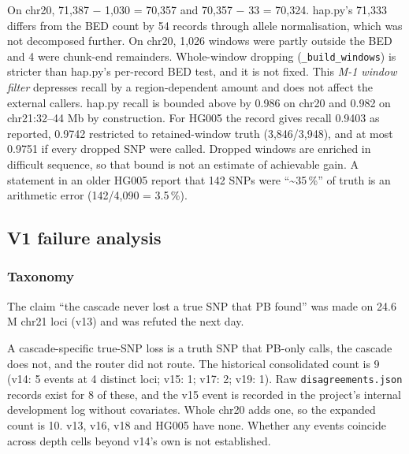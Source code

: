 \documentclass[11pt,a4paper]{article}
\makeatletter
\newcommand{\needspace}[1]{\par\ifdim\pagegoal=\maxdimen\else\dimen@=\pagegoal\advance\dimen@-\pagetotal\ifdim\dimen@<#1\relax\newpage\fi\fi}
\makeatother
\begin{document}
On chr20, 71,387 $-$ 1,030 = 70,357 and 70,357 $-$ 33 = 70,324. hap.py's 71,333 differs from the BED count by 54 records through allele normalisation, which was not decomposed further. On chr20, 1,026 windows were partly outside the BED and 4 were chunk-end remainders. Whole-window dropping (\texttt{\_\allowbreak{}build\_\allowbreak{}windows}) is stricter than hap.py's per-record BED test, and it is not fixed. This \emph{M-1 window filter} depresses recall by a region-dependent amount and does not affect the external callers. hap.py recall is bounded above by 0.986 on chr20 and 0.982 on chr21:32--44 Mb by construction. For HG005 the record gives recall 0.9403 as reported, 0.9742 restricted to retained-window truth (3,846/3,948), and at most 0.9751 if every dropped SNP were called. Dropped windows are enriched in difficult sequence, so that bound is not an estimate of achievable gain. A statement in an older HG005 report that 142 SNPs were ``\textasciitilde{}35\,\%'' of truth is an arithmetic error (142/4,090 = 3.5\,\%).

\needspace{6\baselineskip}
\subsection{\texorpdfstring{V1 failure analysis}{V1 failure analysis}}
\needspace{5\baselineskip}
\subsubsection{\texorpdfstring{Taxonomy}{Taxonomy}}
The claim ``the cascade never lost a true SNP that PB found'' was made on 24.6 M chr21 loci (v13) and was refuted the next day.

A cascade-specific true-SNP loss is a truth SNP that PB-only calls, the cascade does not, and the router did not route. The historical consolidated count is 9 (v14: 5 events at 4 distinct loci; v15: 1; v17: 2; v19: 1). Raw \texttt{disagreements.\allowbreak{}json} records exist for 8 of these, and the v15 event is recorded in the project's internal development log without covariates. Whole chr20 adds one, so the expanded count is 10. v13, v16, v18 and HG005 have none. Whether any events coincide across depth cells beyond v14's own is not established.
\end{document}
